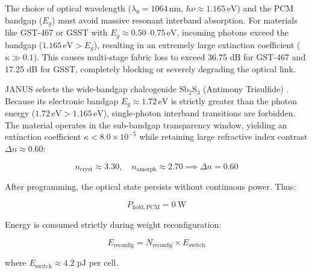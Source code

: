 \documentclass[journal]{IEEEtran}
\begin{document}
The choice of optical wavelength ($\lambda_0 = 1064\,\mathrm{nm}$, $h\nu \approx 1.165\,\mathrm{eV}$) and the PCM bandgap ($E_g$) must avoid massive resonant interband absorption. For materials like GST-467 or GSST with $E_g \approx 0.50\text{--}0.75\,\mathrm{eV}$, incoming photons exceed the bandgap ($1.165\,\mathrm{eV} > E_g$), resulting in an extremely large extinction coefficient ($\kappa \gg 0.1$). This causes multi-stage fabric loss to exceed 36.75 dB for GST-467 and 17.25 dB for GSST, completely blocking or severely degrading the optical link.

JANUS selects the wide-bandgap chalcogenide $\mathrm{Sb_2S_3}$ (Antimony Trisulfide) \cite{Delaney2020}. Because its electronic bandgap $E_g \approx 1.72\,\mathrm{eV}$ is strictly greater than the photon energy ($1.72\,\mathrm{eV} > 1.165\,\mathrm{eV}$), single-photon interband transitions are forbidden. The material operates in the sub-bandgap transparency window, yielding an extinction coefficient $\kappa < 8.0 \times 10^{-5}$ while retaining large refractive index contrast $\Delta n \approx 0.60$:

\begin{equation}
n_{\mathrm{cryst}} \approx 3.30, \quad n_{\mathrm{amorph}} \approx 2.70 \implies \Delta n = 0.60
\end{equation}

After programming, the optical state persists without continuous power. Thus:

\begin{equation}
P_{\mathrm{hold,PCM}} = 0~\mathrm{W}
\end{equation}

Energy is consumed strictly during weight reconfiguration:

\begin{equation}
E_{\mathrm{reconfig}} = N_{\mathrm{reconfig}} \times E_{\mathrm{switch}}
\end{equation}

where $E_{\mathrm{switch}} \approx 4.2\text{ pJ}$ per cell.
\end{document}
